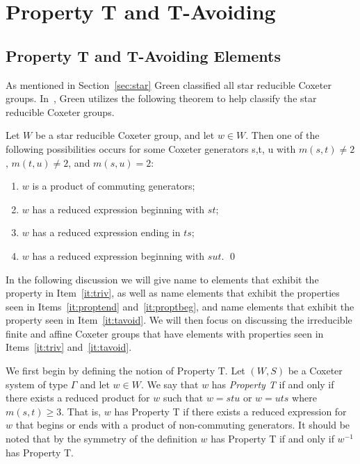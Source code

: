 \chapter{Property T and T-Avoiding}

\section{Property T and T-Avoiding Elements}\label{Tavoid}

As mentioned in Section~\ref{sec:star} Green classified all star reducible Coxeter groups. In~\cite{Green2006a}, Green utilizes the following theorem to help classify the star reducible Coxeter groups. 
\begin{theorem}
	Let $W$ be a star reducible Coxeter group, and let $w \in W$. Then one of the following possibilities occurs for some Coxeter generators s,t, u with $m(s,t) \neq 2$, $m(t,u) \neq 2$, and $m(s,u)=2$:
	\begin{enumerate}
	\item $w$ is a product of commuting generators;\label{it:triv}
	\item $w$ has a reduced expression beginning with $st$;\label{it:proptend}
	\item $w$ has a reduced expression ending in $ts$;\label{it:proptbeg}
	\item $w$ has a reduced expression beginning with $sut$.\label{it:tavoid}	\qed
	\end{enumerate}
\end{theorem}

In the following discussion we will give name to elements that exhibit the property in Item~\ref{it:triv}, as well as name elements that exhibit the properties seen in Items~\ref{it:proptend} and~\ref{it:proptbeg}, and name elements that exhibit the property seen in Item~\ref{it:tavoid}. We will then focus on discussing the irreducible finite and affine Coxeter groups that have elements with properties seen in Items~\ref{it:triv} and~\ref{it:tavoid}.

We first begin by defining the notion of Property T. Let $(W,S)$ be a Coxeter system of type $\Gamma$ and let $w \in W$. We say that $w$ has \emph{Property T} if and only if there exists a reduced product for $w$ such that $w=stu$ or $w=uts$ where $m(s,t)\geq 3$. That is, $w$ has Property T if there exists a reduced expression for $w$ that begins or ends with a product of non-commuting generators. It should be noted that by the symmetry of the definition $w$ has Property T if and only if $w^{-1}$ has Property T.

